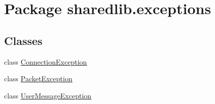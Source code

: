 \hypertarget{namespacesharedlib_1_1exceptions}{}\section{Package sharedlib.\+exceptions}
\label{namespacesharedlib_1_1exceptions}
\subsection*{Classes}
\begin{DoxyCompactItemize}
\item 
class \hyperlink{classsharedlib_1_1exceptions_1_1_connection_exception}{Connection\+Exception}
\item 
class \hyperlink{classsharedlib_1_1exceptions_1_1_packet_exception}{Packet\+Exception}
\item 
class \hyperlink{classsharedlib_1_1exceptions_1_1_user_message_exception}{User\+Message\+Exception}
\end{DoxyCompactItemize}
